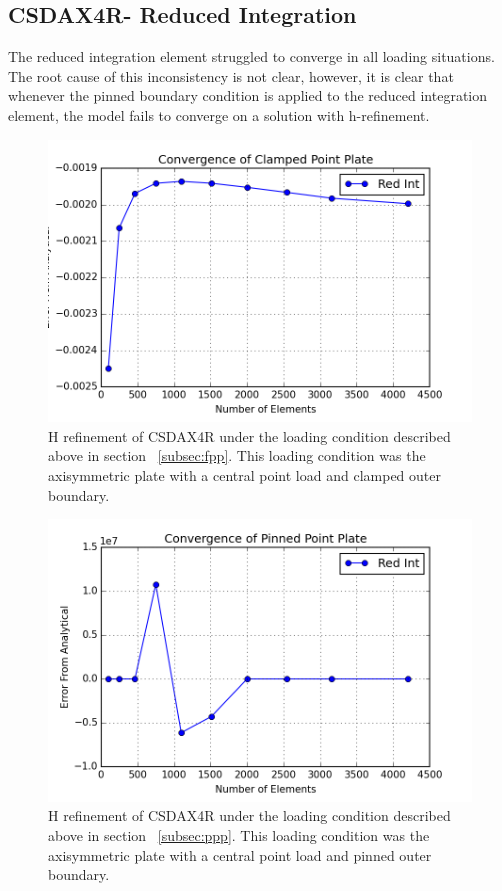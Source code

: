 \documentclass[10pt,letterpaper]{report}
\numberwithin{equation}{chapter}
\begin{document}
\newpage
\subsection{CSDAX4R- Reduced Integration}
The reduced integration element struggled to converge in all loading situations. The root cause of this inconsistency is not clear, however, it is clear that whenever the pinned boundary condition is applied to the reduced integration element, the model fails to converge on a solution with h-refinement.

\begin{figure}[H]
\centering
\includegraphics[width=0.7\linewidth]{./GoodImages/Conv_PlPoCl_3}
\caption[H refinement of CSDAX4R]{H refinement of CSDAX4R under the loading condition described above in section ~\ref{subsec:fpp}. This loading condition was the axisymmetric plate with a central point load and clamped outer boundary.}
\label{fig:Conv_PlPoCl_3}
\end{figure}

\begin{figure}[H]
\centering
\includegraphics[width=0.7\linewidth]{./GoodImages/Conv_PlPoPi_3}
\caption[H refinement of CSDAX4R]{H refinement of CSDAX4R under the loading condition described above in section ~\ref{subsec:ppp}. This loading condition was the axisymmetric plate with a central point load and pinned outer boundary.}
\label{fig:Conv_PlPoCl_3}
\end{figure}
\end{document}
